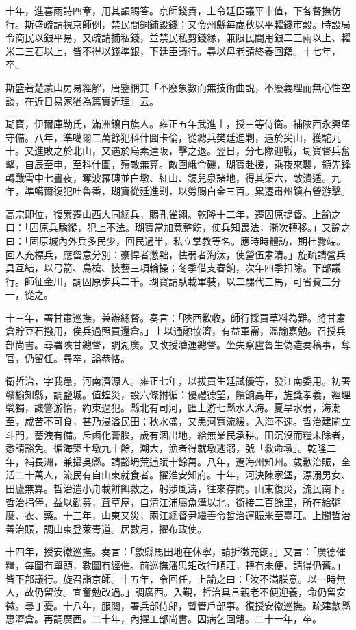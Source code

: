 \begin{pinyinscope}
十年，進喜雨詩四章，用其韻賜答。京師錢貴，上令廷臣議平巿值，下各督撫仿行。斯盛疏請視京師例，禁民間銅鋪毀錢；又令州縣每歲秋以平糶錢巿穀。時設局令商民以銀平易，又疏請捕私錢，並禁民私剪錢緣，兼限民間用銀二三兩以上、糶米二三石以上，皆不得以錢準銀，下廷臣議行。尋以母老請終養回籍。十七年，卒。

斯盛著楚蒙山房易經解，唐鑒稱其「不廢象數而無技術曲說，不廢義理而無心性空談，在近日易家猶為篤實近理」云。

瑚寶，伊爾庫勒氏，滿洲鑲白旗人。雍正五年武進士，授三等侍衛。補陜西永興堡守備。八年，準噶爾二萬餘犯科什圖卡倫，從總兵樊廷進剿，遇於尖山，獲駝九十。又進敗之於北山，又遇於烏素達阪，擊之退。翌日，分七隊迎戰，瑚寶督兵奮擊，自辰至申，至科什圖，殪敵無算。敵圍峨侖磯，瑚寶赴援，乘夜來襲，領先鋒轉戰雪中七晝夜，奪波羅磚並白墩、紅山、鏡兒泉諸地，得其渠六，敵潰遁。九年，準噶爾復犯吐魯番，瑚寶從廷進剿，以勞賜白金三百。累遷肅州鎮右營游擊。

高宗即位，復累遷山西大同總兵，賜孔雀翎。乾隆十二年，遷固原提督。上諭之曰：「固原兵驕縱，犯上不法。瑚寶當加意整飭，使兵知畏法，漸次轉移。」又諭之曰：「固原城內外兵多民少，回民過半，私立掌教等名。應時時體訪，期杜釁端。回人充標兵，應留意分別：豪悍者懲黜，怯弱者淘汰，使營伍肅清。」旋疏請營兵具互結，以弓箭、鳥槍、技藝三項輪操；冬季借支春餉，次年四季扣除。下部議行。師征金川，調固原步兵二千。瑚寶請馱載軍裝，以二騾代三馬，可省費三分一，從之。

十三年，署甘肅巡撫，兼辦總督。奏言：「陜西歉收，師行採買草料為難。將甘肅倉貯豆石撥用，俟兵過照買還倉。」上以通融協濟，有益軍需，溫諭嘉勉。召授兵部尚書。尋署陜甘總督，調湖廣。又改授漕運總督。坐失察盧魯生偽造奏稿事，奪官，仍留任。尋卒，謚恭恪。

衛哲治，字我愚，河南濟源人。雍正七年，以拔貢生廷試優等，發江南委用。初署贛榆知縣，調鹽城。值蝗災，設六條拊循：優禮德望，饋餉高年，旌獎孝義，經理煢獨，譏警游惰，約束過犯。縣北有司河，匯上游七縣水入海。夏旱水弱，海潮至，咸苦不可食，甚乃浸溢民田；秋水盛，又患河寬流緩，入海不速。哲治建閘立斗門，蓄洩有備。斥鹵化膏腴，歲有涸出地，給無業民承耕。田沉沒而糧未除者，悉請豁免。循海築土墩九十餘，潮大，漁者得就墩逃溺，號「救命墩」。乾隆二年，補長洲，兼攝吳縣。請豁坍荒逋賦十餘萬。八年，遷海州知州。歲歉治賑，全活二十萬人，流民有自山東就食者。擢淮安知府。十年，河決陳家堡，漂溺男女、田廬無算。哲治遣小舟載餅餌救之，躬涉風濤，往來存問。山東復災，流民南下。哲治捐俸，益以勸募，葺草屋，自清江浦屬魚溝以北，銜接二百餘里，所在給粥糜、衣、藥。十三年，山東又災，兩江總督尹繼善令哲治運賑米至臺莊。上聞哲治善治賑，調山東登萊青道。居數月，擢布政使。

十四年，授安徽巡撫。奏言：「歙縣馬田地在休寧，請折徵充餉。」又言：「廣德催糧，每圖有單頭，數圖有經催。前巡撫潘思矩改行順莊，轉有未便，請得仍舊。」皆下部議行。旋召詣京師。十五年，令回任，上諭之曰：「汝不滿朕意。以一時無人，故仍留汝。宜奮勉改過。」調廣西。入覲，哲治具言親老不便迎養，命仍留安徽。尋丁憂。十八年，服闋，署兵部侍郎，暫管戶部事。復授安徽巡撫。疏建歙縣惠濟倉。再調廣西。二十年，內擢工部尚書。因病乞回籍。二十一年，卒。


\end{pinyinscope}

